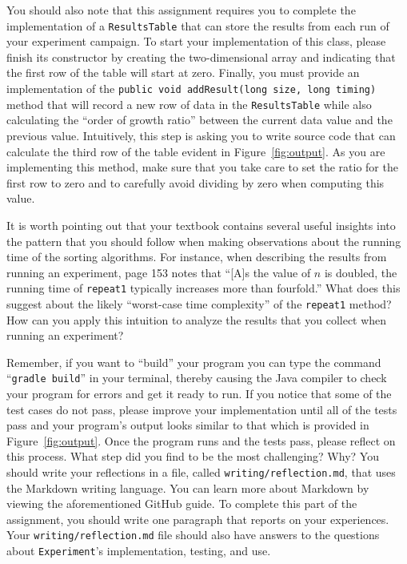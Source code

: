 \documentclass[11pt]{article}
\newcommand{\mainprogram}{\lstinline{Experiment}}
\newcommand{\reflection}{\lstinline{writing/reflection.md}}
\newcommand{\gradlebuild}{\command{gradle build}}
\newcommand{\command}[1]{``\lstinline{#1}''}
\newcommand{\program}[1]{\lstinline{#1}}
\newcommand{\step}[1]{``{#1}''}
\begin{document}
You should also note that this assignment requires you to complete the
implementation of a \program{ResultsTable} that can store the results from each
run of your experiment campaign. To start your implementation of this class,
please finish its constructor by creating the two-dimensional array and
indicating that the first row of the table will start at zero. Finally, you
must provide an implementation of the \program{public void addResult(long size,
long timing)} method that will record a new row of data in the
\program{ResultsTable} while also calculating the ``order of growth ratio''
between the current data value and the previous value. Intuitively, this step is
asking you to write source code that can calculate the third row of the table
evident in Figure~\ref{fig:output}. As you are implementing this method, make
sure that you take care to set the ratio for the first row to zero and to
carefully avoid dividing by zero when computing this value.

It is worth pointing out that your textbook contains several useful insights
into the pattern that you should follow when making observations about the
running time of the sorting algorithms. For instance, when describing the
results from running an experiment, page 153 notes that ``[A]s the value of $n$
is doubled, the running time of {\tt repeat1} typically increases more than
fourfold.'' What does this suggest about the likely ``worst-case time
complexity'' of the {\tt repeat1} method? How can you apply this intuition to
analyze the results that you collect when running an experiment?


Remember, if you want to \step{build} your program you can type the command
\gradlebuild{} in your terminal, thereby causing the Java compiler to check your
program for errors and get it ready to run. If you notice that some of the test
cases do not pass, please improve your implementation until all of the tests
pass and your program's output looks similar to that which is provided in
Figure~\ref{fig:output}. Once the program runs and the tests pass, please
reflect on this process. What step did you find to be the most challenging? Why?
You should write your reflections in a file, called \reflection{}, that uses the
Markdown writing language. You can learn more about Markdown by viewing the
aforementioned GitHub guide. To complete this part of the assignment, you should
write one paragraph that reports on your experiences. Your \reflection{} file
should also have answers to the questions about \mainprogram{}'s implementation,
testing, and use.
\end{document}
